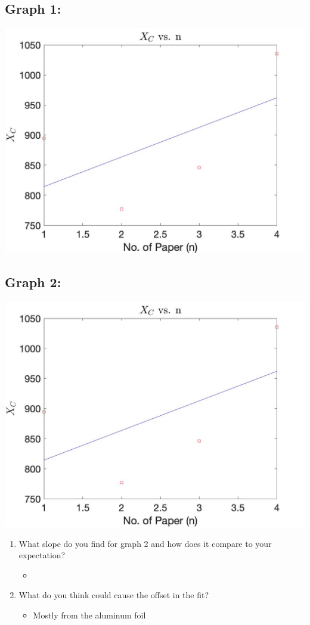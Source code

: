 \documentclass{article}
\begin{document}
\begin{center}
  \subsection*{Graph 1:}
  \includegraphics[scale=0.4]{graph1.jpg}
  \subsection*{Graph 2:}
  \includegraphics[scale=0.4]{graph2.jpg}
\end{center}

\begin{center}
  \begin{enumerate}
    \item What slope do you find for graph 2 and how does it compare to your expectation?
    \begin{itemize}
      \item
    \end{itemize}
    \item What do you think could cause the offset in the fit?
    \begin{itemize}
      \item Mostly from the aluminum foil
    \end{itemize}
  \end{enumerate}
\end{center}
\end{document}
